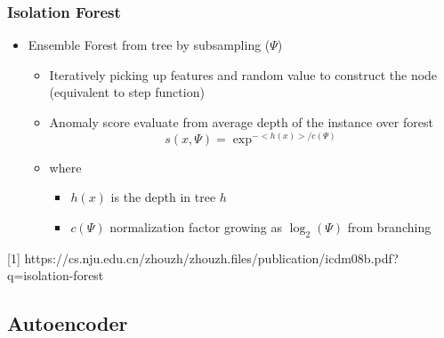 \documentclass{beamer}
\begin{document}
\begin{frame}
\frametitle{Isolation Forest}
\begin{itemize}
    \item Ensemble Forest from tree by subsampling ($\Psi$)
    \begin{itemize}
        \item Iteratively picking up features and random value to construct the node (equivalent to step function)
        \item Anomaly score evaluate from average depth of the instance over forest
        \begin{equation}
            s(x, \Psi) = \exp^{-<h(x)>/c(\Psi)}
        \end{equation}
        \item where
        \begin{itemize}
            \item $h(x)$ is the depth in tree $h$
            \item $c(\Psi)$ normalization factor growing as $\log_2(\Psi)$ from branching
        \end{itemize}
    \end{itemize}
\end{itemize}
\vspace{0.2in} \tiny [1] https://cs.nju.edu.cn/zhouzh/zhouzh.files/publication/icdm08b.pdf?q=isolation-forest
\end{frame}

\subsection{Autoencoder}
\end{document}
